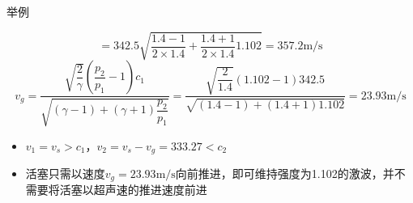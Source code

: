 \begin{frame}{举例}
\begin{block}
{\begin{equation*}
    =
    342.5
    \sqrt{\frac{1.4-1}{2\times1.4}+\frac{1.4+1}{2\times1.4}1.102}
    =
    357.2\mathrm{m/s}
\end{equation*}
\begin{equation*}
  v_{g}
    =
    \dfrac
    {\sqrt{\dfrac{2}{\gamma}}\left(\dfrac{p_{2}}{p_{1}}-1\right)c_{1}}
    {\sqrt{(\gamma-1)+(\gamma+1)\dfrac{p_{2}}{p_{1}}}}
    =
    \dfrac
    {\sqrt{\dfrac{2}{1.4}}(1.102-1)342.5}
    {\sqrt{(1.4-1)+(1.4+1)1.102}}
    =
    23.93\mathrm{m/s}
\end{equation*}
\vspace*{-1.2em}
   \begin{itemize}
     \item $v_{1}=v_{s}>c_{1}$，$v_{2}=v_{s}-v_{g}=333.27<c_{2}$
     \item 活塞只需以速度$v_{g}=23.93\mathrm{m/s}$向前推进，即可维持强度为1.102的激波，并不需要将活塞以超声速的推进速度前进
   \end{itemize}
 }
  \end{block}
\end{frame}
